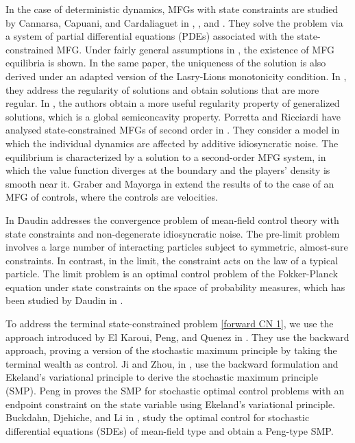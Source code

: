 \documentclass[11pt,a4paper]{article}
\begin{document}
In the case of deterministic dynamics, MFGs with state constraints are studied by Cannarsa, Capuani, and Cardaliaguet  in \cite{CanCap}, \cite{CanCar}, and \cite{Cannarsa}. They solve the problem via a system of partial differential equations (PDEs) associated with the state-constrained MFG. 
Under fairly general assumptions in \cite{CanCap},  the existence of MFG equilibria is shown. In the same paper, the uniqueness of the solution is also derived under an adapted version of the Lasry-Lions monotonicity condition. In \cite{CanCar}, they address the regularity of solutions and obtain solutions that are more regular. In \cite{Cannarsa}, the authors obtain a more useful regularity property of generalized solutions, which is a global semiconcavity property. 
Porretta and Ricciardi have analysed state-constrained MFGs of second order in \cite{Porretta}. They consider a model in which the individual dynamics are affected by additive idiosyncratic noise. The equilibrium is characterized by a solution to a second-order MFG system, in which the value function diverges at the boundary and the players' density is smooth near it. Graber and Mayorga in \cite {GM} extend the results of \cite{CanCap} to the case of an MFG of controls, where the controls are velocities. 
\par
 In \cite{Daudin II} Daudin addresses the convergence problem of mean-field control theory with state constraints and non-degenerate idiosyncratic noise. The pre-limit problem involves a large number of interacting particles subject to symmetric, almost-sure constraints. In contrast, in the limit, the constraint acts on the law of a typical particle.  The limit problem is an optimal control problem of the Fokker-Planck equation under state constraints on the space of probability measures, which has been studied by Daudin  in \cite{Daudin I}.\par
To address the terminal state-constrained problem 
\eqref{forward CN 1}, we use the approach introduced by El Karoui, Peng, and Quenez in \cite{Karoui Peng}. They use the backward approach, proving a version of the stochastic maximum principle by taking the terminal wealth as control. Ji and Zhou, in  \cite{Ji Zhou}, use the backward formulation and Ekeland's variational principle \cite{Ekeland} to derive the stochastic maximum principle (SMP). Peng in \cite{Peng} proves the SMP for stochastic optimal control problems with an endpoint constraint on the state variable using Ekeland's variational principle. Buckdahn, Djehiche, and Li in \cite{Buckdahn Li 1}, \cite{Buckdahn Li 2} study the optimal control for stochastic differential equations (SDEs) of mean-field type and obtain a Peng-type SMP. 
\end{document}
